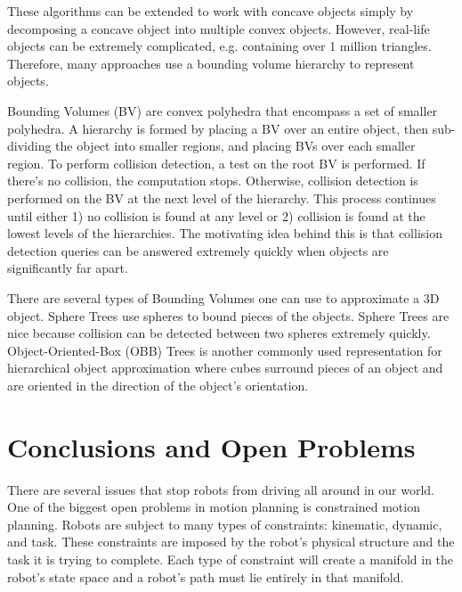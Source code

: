 \documentclass[10pt,conference]{ieeeconf}
\begin{document}
	These algorithms can be extended to work with concave objects simply by decomposing a concave object into multiple convex objects. However, real-life objects can be extremely complicated, e.g. containing over 1 million triangles. Therefore, many approaches use a bounding volume hierarchy to represent objects.
	
	Bounding Volumes (BV) are convex polyhedra	that encompass a set of smaller polyhedra. A hierarchy is formed by placing a BV over an entire object, then sub-dividing the object into smaller regions, and placing BVs over each smaller region. To perform collision detection, a test on the root BV is performed. If there's no collision, the computation stops. Otherwise, collision detection is performed on the BV at the next level of the hierarchy. This process continues until either 1) no collision is found at any level or 2) collision is found at the lowest levels of the hierarchies. The motivating idea behind this is that collision detection queries can be answered extremely quickly when objects are significantly far apart. 
	
	There are several types of Bounding Volumes one can use to approximate a 3D object. Sphere Trees \cite{hubbard1996approximating} use spheres to bound pieces of the objects. Sphere Trees are nice because collision can be detected between two spheres extremely quickly. Object-Oriented-Box (OBB) Trees \cite{gottschalk1996obbtree} is another commonly used representation for hierarchical object approximation where cubes surround pieces of an object and are oriented in the direction of the object's orientation.



\section{Conclusions and Open Problems}
    
    There are several issues that stop robots from driving all around in our world. One of the biggest open problems in motion planning is constrained motion planning. Robots are subject to many types of constraints: kinematic, dynamic, and task. These constraints are imposed by the robot's physical structure and the task it is trying to complete. Each type of constraint will create a manifold in the robot's state space and a robot's path must lie entirely in that manifold. 
    
    
\end{document}
